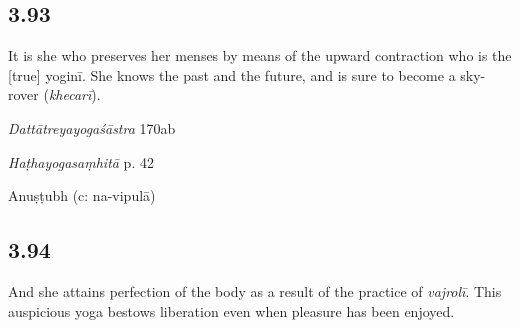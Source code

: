 \begin{ekdosis}
\subsection*{3.93}
\begin{translation}[hp03_093]
It is she who preserves her menses by means of the upward contraction who is the [true] yoginī.
She knows the past and the future, and is sure to become a sky-rover (\emph{khecarī}).
\end{translation}

\begin{sources}[hp03_093]
\emph{Dattātreyayogaśāstra} 170ab
\begin{versinnote}
\end{versinnote}
\end{sources}

\begin{testimonia}[hp03_093]
\emph{Haṭhayogasaṃhitā} p. 42
\begin{versinnote}
\end{versinnote}

\end{testimonia}


\begin{metre}[hp03_093]
Anuṣṭubh (c: na-vipulā)
\end{metre}

\subsection*{3.94}
\begin{translation}[hp03_094]
And she attains perfection of the body as a result of the practice of \emph{vajrolī}. This auspicious yoga bestows liberation even when pleasure has been enjoyed.
\end{translation}


\end{ekdosis}
